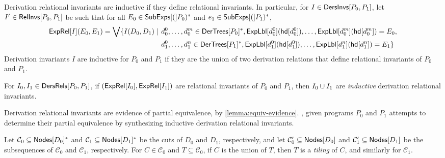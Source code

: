 Derivation relational invariants are inductive if they define
relational invariants.
%
In particular, for $I \in \mathsf{DersInvs}[ P_0, P_1 ]$, let $I' \in
\mathsf{RelInvs}[ P_0, P_1 ]$ be such that for all $E_0 \in \mathsf{SubExps}[ ( ]P_0)^{*}$
and $e_1 \in \mathsf{SubExps}[ ( ]P_1)^{*}$,
\begin{align*}
  \exprel{I}(E_0, E_1) = %
  \biglor \setformer{ I(D_0, D_1)}{ %
    & d_0^0, \ldots, d_0^m \in \dertrees{P_0}^{*}, %
    \explabel{d_0^0}(\head{d_0^0}), \ldots,
    \explabel{d_0^m}(\head{d_0^m}) = E_0, \\
    & d_1^0, \ldots, d_1^n \in \dertrees{P_1}^{*},  %
    \explabel{d_1^0}(\head{d_1^0}), \ldots,
    \explabel{d_1^n}(\head{d_1^n}) = E_1 }
\end{align*}
%
Derivation invariants $I$ are inductive for $P_0$ and $P_1$ if they
are the union of two derivation relations that define relational
invariants of $P_0$ and $P_1$.
%
\begin{defn}
  \label{defn:inductive-der-rels}
  For $I_0, I_1 \in \mathsf{DersRels}[ P_0, P_1 ]$, if $(\mathsf{ExpRel}[ I_0 ],
  \mathsf{ExpRel}[ I_1 ])$ are relational invariants of $P_0$ and $P_1$, then
  $I_0 \cup I_1$ are \emph{inductive} derivation relational
  invariants.
\end{defn}
%
Derivation relational invariants are evidence of partial equivalence,
by \autoref{lemma:equiv-evidence}.
%
\sys, given programs $P_0$ and $P_1$ attempts to determine their
partial equivalence by synthesizing inductive derivation relational
invariants.

%
Let $\mathcal{C}_0 \subseteq \mathsf{Nodes}[ D_0 ]^{*}$ and $\mathcal{C}_1
\subseteq \mathsf{Nodes}[ D_1 ]^{*}$ be the cuts of $D_0$ and $D_1$,
respectively, and let $\mathcal{C}_0' \subseteq \mathsf{Nodes}[ D_0 ]$ and
$\mathcal{C}_1' \subseteq \mathsf{Nodes}[ D_1 ]$ be the subsequences of
$\mathcal{C}_0$ and $\mathcal{C}_1$, respectively.
%
For $C \in \mathcal{C}_0$ and $T \subseteq \mathcal{C}_0$, if $C$ is
the union of $T$, then $T$ is a \emph{tiling} of $C$, and similarly
for $\mathcal{C}_1$.

